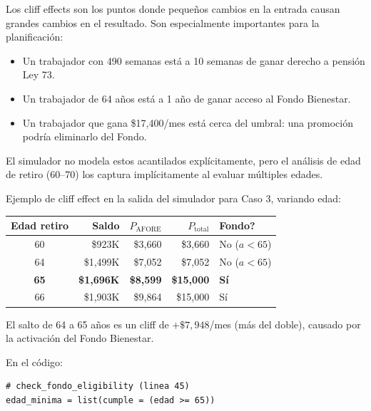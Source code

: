 \documentclass[11pt,a4paper]{report}
\theoremstyle{remark}
\begin{document}
\begin{tcolorbox}[colback=green!5!white, colframe=green!50!black, title=\textbf{Intuici\'on}]
Los cliff effects son los puntos donde peque\~nos cambios en la entrada causan grandes cambios en el resultado. Son especialmente importantes para la planificaci\'on:

\begin{itemize}
  \item Un trabajador con 490 semanas est\'a a 10 semanas de ganar derecho a pensi\'on Ley 73.
  \item Un trabajador de 64 a\~nos est\'a a 1 a\~no de ganar acceso al Fondo Bienestar.
  \item Un trabajador que gana \$17,400/mes est\'a cerca del umbral: una promoci\'on podr\'ia eliminarlo del Fondo.
\end{itemize}

El simulador no modela estos acantilados expl\'icitamente, pero el an\'alisis de edad de retiro (60--70) los captura impl\'icitamente al evaluar m\'ultiples edades.
\end{tcolorbox}

\begin{tcolorbox}[colback=orange!5!white, colframe=orange!75!black, title=\textbf{Aplicaci\'on en C\'odigo}]
Ejemplo de cliff effect en la salida del simulador para Caso 3, variando edad:

\begin{center}
\small
\begin{tabular}{crrrl}
\toprule
Edad retiro & Saldo & $P_{\text{AFORE}}$ & $P_{\text{total}}$ & Fondo? \\
\midrule
60 & \$923K & \$3,660 & \$3,660 & No ($a < 65$) \\
64 & \$1,499K & \$7,052 & \$7,052 & No ($a < 65$) \\
\textbf{65} & \textbf{\$1,696K} & \textbf{\$8,599} & \textbf{\$15,000} & \textbf{S\'i} \\
66 & \$1,903K & \$9,864 & \$15,000 & S\'i \\
\bottomrule
\end{tabular}
\end{center}

El salto de 64 a 65 a\~nos es un cliff de $+\$7{,}948$/mes (m\'as del doble), causado por la activaci\'on del Fondo Bienestar.

En el c\'odigo:
\begin{lstlisting}
# check_fondo_eligibility (linea 45)
edad_minima = list(cumple = (edad >= 65))
\end{lstlisting}
\end{tcolorbox}
\end{document}
